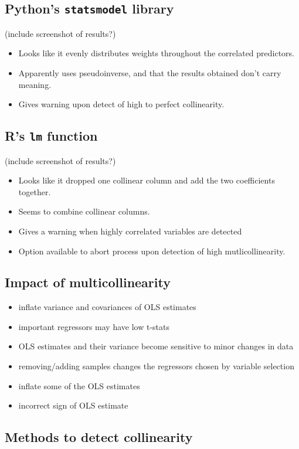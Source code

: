 \documentclass[12pt]{article}
\begin{document}
	\subsection{Python's \texttt{statsmodel} library}
	(include screenshot of results?)
	\begin{itemize}
		\item Looks like it evenly distributes weights throughout the correlated predictors.
		\item Apparently uses pseudoinverse, and that the results obtained don't carry meaning.
		\item Gives warning upon detect of high to perfect collinearity.
	\end{itemize}
	
	\subsection{R's \texttt{lm} function}
	(include screenshot of results?)
	
	\begin{itemize}
		\item Looks like it dropped one collinear column and add the two coefficients together.
		\item Seems to combine collinear columns.
		\item Gives a warning when highly correlated variables are detected
		\item Option available to abort process upon detection of high mutlicollinearity.
	\end{itemize}
	
	\subsection{Impact of multicollinearity}
	\begin{itemize}
		\item inflate variance and covariances of OLS estimates 
		\item important regressors may have low t-stats 
		\item  OLS estimates and their variance become sensitive to minor changes in data
		\item removing/adding samples changes the regressors chosen by variable selection
		\item  inflate some of the OLS estimates
		\item  incorrect sign of OLS estimate
	\end{itemize}
	
	\subsection{Methods to detect collinearity}
	
\end{document}
